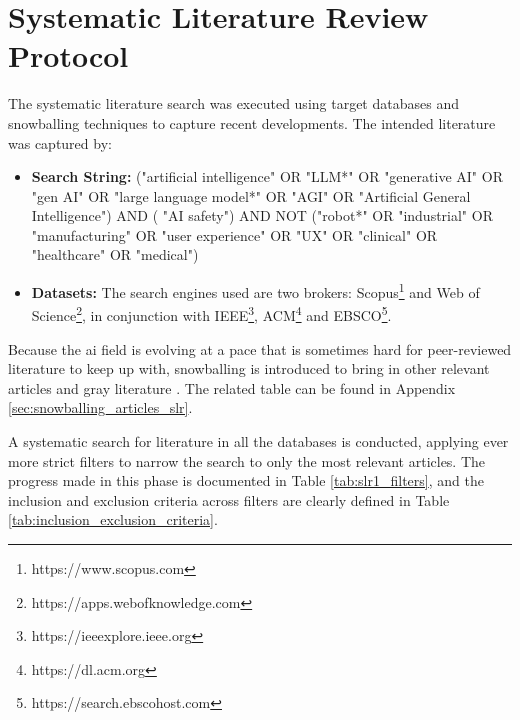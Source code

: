 

\section{Systematic Literature Review Protocol}
\label{sec:slr_protocol}

The systematic literature search was executed using target databases and snowballing techniques to capture recent developments. The intended literature was captured by:

	\begin{itemize}
		\item \textbf{Search String:} ("artificial intelligence" OR "LLM*" OR "generative AI" OR "gen AI" OR "large language model*" OR "AGI" OR "Artificial General Intelligence") AND ( "AI safety") AND NOT ("robot*" OR "industrial" OR "manufacturing" OR "user experience" OR "UX" OR "clinical" OR "healthcare" OR "medical")
		\item \textbf{Datasets:} The search engines used are two brokers: Scopus\footnote{https://www.scopus.com} and Web of Science\footnote{https://apps.webofknowledge.com}, in conjunction with IEEE\footnote{https://ieeexplore.ieee.org}, ACM\footnote{https://dl.acm.org} and EBSCO\footnote{https://search.ebscohost.com}.
	\end{itemize}

	Because the \gls{ai} field is evolving at a pace that is sometimes hard for peer-reviewed literature to keep up with, snowballing is introduced to bring in other relevant articles and gray literature \cite{wohlin_guidelines_2014}. The related table can be found in Appendix \ref{sec:snowballing_articles_slr}.

	A systematic search for literature in all the databases is conducted, applying ever more strict filters to narrow the search to only the most relevant articles. The progress made in this phase is documented in Table \ref{tab:slr1_filters}, and the inclusion and exclusion criteria across filters are clearly defined in Table \ref{tab:inclusion_exclusion_criteria}. 

